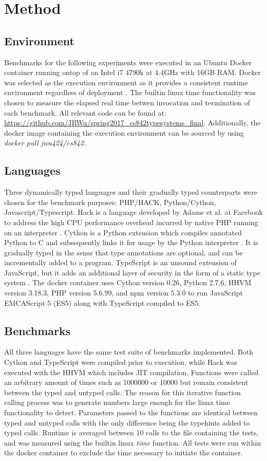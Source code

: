 \section{Method}
\subsection{Environment}
Benchmarks for the following experiments were executed in an Ubuntu Docker container running ontop of an Intel i7 4790k at 4.4GHz with 16GB RAM. Docker was selected as the execution environment as it provides a consistent runtime environment regardless of deployment \cite{Merkel:2014:DLL:2600239.2600241}. The builtin linux time functionality was chosen to measure the elapsed real time betwen invocation and termination of each benchmark. All relevant code can be found at: \url{https://github.com/JRWu/spring2017_cs842typesystems_final}. Additionally, the docker image containing the execution environment can be sourced by using \textit{docker pull jwu424/cs842}. 

\subsection{Languages}
Three dynamically typed languages and their gradually typed counterparts were chosen for the benchmark purposes: PHP/HACK, Python/Cython, Javascript/Typescript. Hack is a language developed by Adams et al. at Facebook to address the high CPU performance overhead incurred by native PHP running on an interpreter \cite{Adams:2014:HVM:2660193.2660199}. Cython is a Python extension which compiles annotated Python to C and subsequently links it for usage by the Python interpreter \cite{behnel2011cython}. It is gradually typed in the sense that type annotations are optional, and can be incrementally added to a program. TypeScript is an unsound extension of JavaScript, but it adds an additional layer of security in the form of a static type system \cite{bierman2014understanding}. The docker container uses Cython version 0.26, Python 2.7.6, HHVM version 3.18.3, PHP version 5.6.99, and npm version 5.3.0 to run JavaScript EMCAScript 5 (ES5) along with TypeScript compiled to ES5.

\subsection{Benchmarks}\label{Benchmarks}
All three languages have the same test suite of benchmarks implemented. Both Cython and TypeScript were compiled prior to execution, while Hack was executed with the HHVM which includes JIT compilation. Functions were called an arbitrary amount of times such as 1000000 or 10000 but remain consistent between the typed and untyped calls. The reason for this iterative function calling process was to generate numbers large enough for the linux time functionality to detect. Parameters passed to the functions are identical between typed and untyped calls with the only difference being the typehints added to typed calls. Runtime is averaged between 10 calls to the file containing the tests, and was measured using the builtin linux \textit{time} function. All tests were run within the docker container to exclude the time necessary to initiate the container. 

